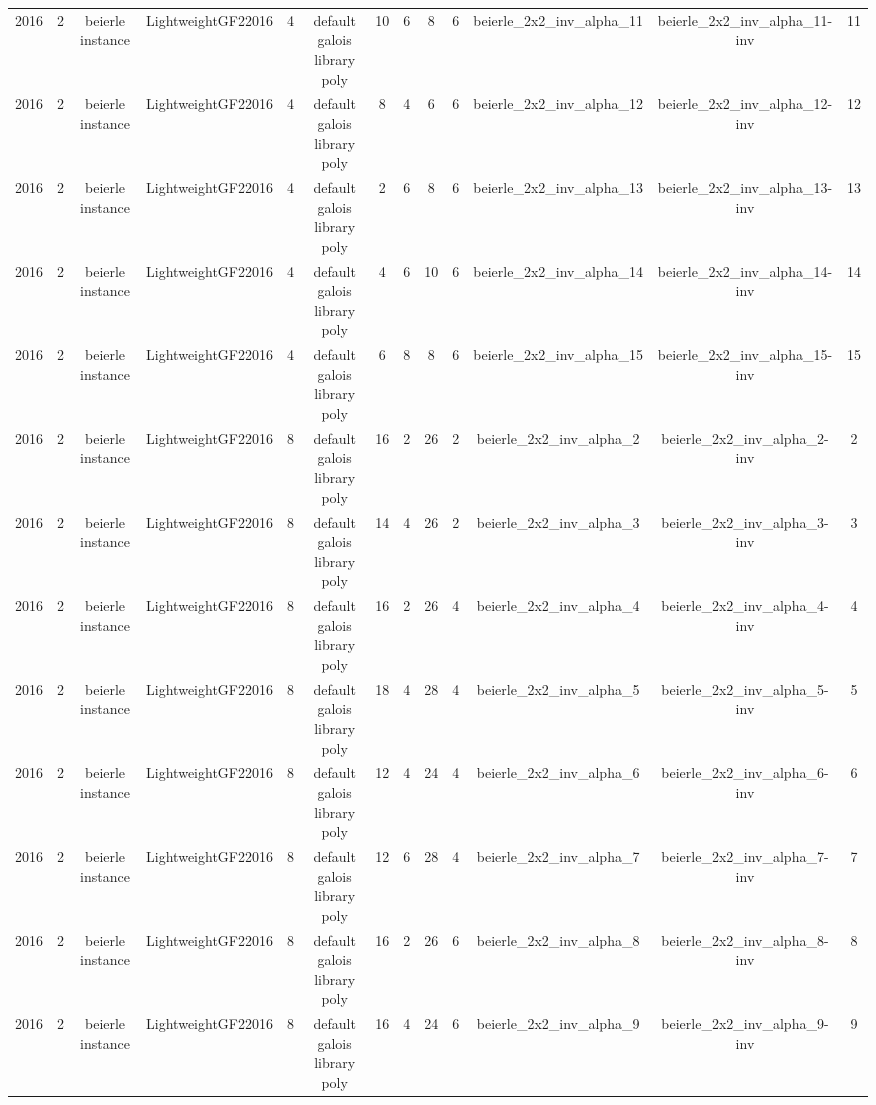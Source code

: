 \begin{tabular}{c c c c c c c c c c c c c}
2016 & 2 & beierle instance & LightweightGF22016 & 4 & default galois library poly & 10 & 6 & 8 & 6 & beierle_2x2_inv_alpha_11 & beierle_2x2_inv_alpha_11-inv & 11 \\
2016 & 2 & beierle instance & LightweightGF22016 & 4 & default galois library poly & 8 & 4 & 6 & 6 & beierle_2x2_inv_alpha_12 & beierle_2x2_inv_alpha_12-inv & 12 \\
2016 & 2 & beierle instance & LightweightGF22016 & 4 & default galois library poly & 2 & 6 & 8 & 6 & beierle_2x2_inv_alpha_13 & beierle_2x2_inv_alpha_13-inv & 13 \\
2016 & 2 & beierle instance & LightweightGF22016 & 4 & default galois library poly & 4 & 6 & 10 & 6 & beierle_2x2_inv_alpha_14 & beierle_2x2_inv_alpha_14-inv & 14 \\
2016 & 2 & beierle instance & LightweightGF22016 & 4 & default galois library poly & 6 & 8 & 8 & 6 & beierle_2x2_inv_alpha_15 & beierle_2x2_inv_alpha_15-inv & 15 \\
2016 & 2 & beierle instance & LightweightGF22016 & 8 & default galois library poly & 16 & 2 & 26 & 2 & beierle_2x2_inv_alpha_2 & beierle_2x2_inv_alpha_2-inv & 2 \\
2016 & 2 & beierle instance & LightweightGF22016 & 8 & default galois library poly & 14 & 4 & 26 & 2 & beierle_2x2_inv_alpha_3 & beierle_2x2_inv_alpha_3-inv & 3 \\
2016 & 2 & beierle instance & LightweightGF22016 & 8 & default galois library poly & 16 & 2 & 26 & 4 & beierle_2x2_inv_alpha_4 & beierle_2x2_inv_alpha_4-inv & 4 \\
2016 & 2 & beierle instance & LightweightGF22016 & 8 & default galois library poly & 18 & 4 & 28 & 4 & beierle_2x2_inv_alpha_5 & beierle_2x2_inv_alpha_5-inv & 5 \\
2016 & 2 & beierle instance & LightweightGF22016 & 8 & default galois library poly & 12 & 4 & 24 & 4 & beierle_2x2_inv_alpha_6 & beierle_2x2_inv_alpha_6-inv & 6 \\
2016 & 2 & beierle instance & LightweightGF22016 & 8 & default galois library poly & 12 & 6 & 28 & 4 & beierle_2x2_inv_alpha_7 & beierle_2x2_inv_alpha_7-inv & 7 \\
2016 & 2 & beierle instance & LightweightGF22016 & 8 & default galois library poly & 16 & 2 & 26 & 6 & beierle_2x2_inv_alpha_8 & beierle_2x2_inv_alpha_8-inv & 8 \\
2016 & 2 & beierle instance & LightweightGF22016 & 8 & default galois library poly & 16 & 4 & 24 & 6 & beierle_2x2_inv_alpha_9 & beierle_2x2_inv_alpha_9-inv & 9 \\

\end{tabular}
